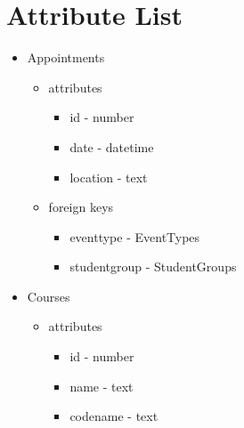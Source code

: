 \chapter{Attribute List}
\label{attribute-list}
\begin{itemize}
	\item Appointments
	\begin{itemize}
		\item attributes
		\begin{itemize}
			\item id - number
			\item date - datetime
			\item location - text
		\end{itemize}
		\item foreign keys
		\begin{itemize}
			\item eventtype - EventTypes
			\item studentgroup - StudentGroups
		\end{itemize}
	\end{itemize}
	
	\item Courses
	\begin{itemize}
		\item attributes
		\begin{itemize}
			\item id - number
			\item name - text
			\item codename - text
		\end{itemize}
	\end{itemize}
	

\end{itemize}
